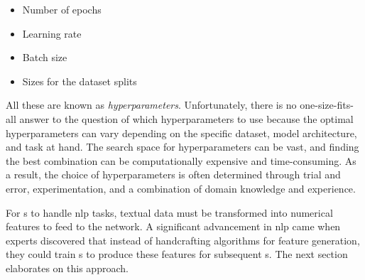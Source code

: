 \begin{itemize}
    \item Number of epochs
    \item Learning rate
    \item Batch size
    \item Sizes for the dataset splits
\end{itemize}

All these are known as \emph{hyperparameters}. Unfortunately, there is no one-size-fits-all answer to the question of which hyperparameters to use because the optimal hyperparameters can vary depending on the specific dataset, model architecture, and task at hand. The search space for hyperparameters can be vast, and finding the best combination can be computationally expensive and time-consuming. As a result, the choice of hyperparameters is often determined through trial and error, experimentation, and a combination of domain knowledge and experience.




\label{02_nn_nlp_tasks}

For \neuralNetwork{}s to handle \gls{nlp} tasks, textual data must be transformed into numerical features to feed to the network. 
A significant advancement in \gls{nlp} came when experts discovered that instead of handcrafting algorithms for feature generation, they could train \neuralNetwork{}s to produce these features for subsequent \neuralNetwork{}s.
The next section elaborates on this approach.



